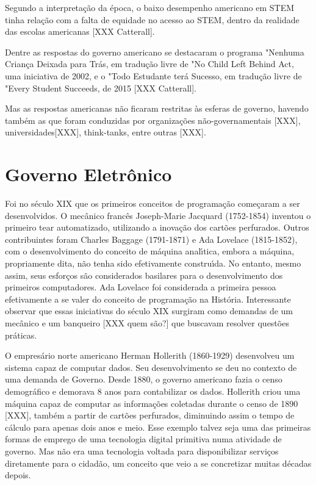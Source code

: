 \documentclass[
12pt,		%
openright,	%
twoside,  %
a4paper,			%
chapter=TITLE,		%
english,			%
french,				%
spanish,			%
brazil				%
]{USPSC-classe/USPSC}
\begin{document}
Segundo a interpreta\c{c}\~ao da \'epoca, o baixo desempenho americano em STEM tinha rela\c{c}\~ao com a falta de equidade no acesso ao STEM, dentro da realidade das escolas americanas [XXX Catterall].




Dentre as respostas do governo americano se destacaram o programa "Nenhuma Crian\c{c}a Deixada para Tr\'as, em tradu\c{c}\~ao livre de "No Child Left Behind Act, uma iniciativa de 2002, e o "Todo Estudante ter\'a Sucesso, em tradu\c{c}\~ao livre de "Every Student Succeeds, de 2015 [XXX Catterall].




Mas as respostas americanas n\~ao ficaram restritas \`as esferas de governo, havendo tamb\'em as que foram conduzidas por organiza\c{c}\~oes n\~ao-governamentais [XXX], universidades[XXX], think-tanks, entre outras [XXX].




\section[Governo Eletr\^onico]{Governo Eletr\^onico}\label{Governo Eletr\^onico}
Foi no s\'eculo XIX que os primeiros conceitos de programa\c{c}\~ao come\c{c}aram a ser desenvolvidos. O mec\^anico franc\^es Joseph-Marie Jacquard (1752-1854) inventou o primeiro tear automatizado, utilizando a inova\c{c}\~ao dos cart\~oes perfurados. Outros contribuintes foram Charles Baggage (1791-1871) e Ada Lovelace (1815-1852), com o desenvolvimento do conceito de m\'aquina anal\'{\i}tica, embora a m\'aquina, propriamente dita, n\~ao tenha sido efetivamente constru\'{\i}da. No entanto, mesmo assim, seus esfor\c{c}os s\~ao considerados basilares para o desenvolvimento dos primeiros computadores. Ada Lovelace foi considerada a primeira pessoa efetivamente a se valer do conceito de programa\c{c}\~ao na Hist\'oria. Interessante observar que essas iniciativas do s\'eculo XIX surgiram como demandas de um mec\^anico e um banqueiro [XXX quem s\~ao?] que buscavam resolver quest\~oes pr\'aticas.




O empres\'ario norte americano Herman Hollerith (1860-1929) desenvolveu um sistema capaz de computar dados. Seu desenvolvimento se deu no contexto de uma demanda de Governo. Desde 1880, o governo americano fazia o censo demogr\'afico e demorava 8 anos para contabilizar os dados. Hollerith criou uma m\'aquina capaz de computar as informa\c{c}\~oes coletadas durante o censo de 1890 [XXX], tamb\'em a partir de cart\~oes perfurados, diminuindo assim o tempo de c\'alculo para apenas dois anos e meio. Esse exemplo talvez seja uma das primeiras formas de emprego de uma tecnologia digital primitiva numa atividade de governo. Mas n\~ao era uma tecnologia voltada para disponibilizar servi\c{c}os diretamente para o cidad\~ao, um conceito que veio a se concretizar muitas d\'ecadas depois.
\end{document}
